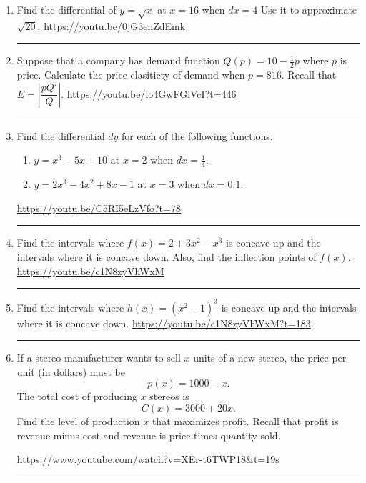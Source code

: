 \documentclass[12pt]{article}
\begin{document}
\begin{enumerate}
\item Find the differential of $y = \sqrt{x}$ at $x = 16$ when $dx = 4$ Use it to approximate $\sqrt{20}$. 
\vfill
\hfill \url{https://youtu.be/0jG3enZdEmk}
\hrule


\item Suppose that a company has demand function $Q(p) = 10 - \frac{1}{2}p$ where $p$ is price.  Calculate the price elasiticty of demand when $p = \$16$. Recall that $E = \left| \dfrac{pQ'}{Q} \right|$. 
\vfill
\hfill \url{https://youtu.be/io4GwFGiVcI?t=446}
\hrule

\item Find the differential $dy$ for each of the following functions. 
\begin{enumerate}
\item $y = x^3 - 5 x + 10$ at $x = 2$ when $dx = \tfrac{1}{4}$. \\ \bigskip
\item $y = 2x^3 - 4x^2 + 8x - 1$ at $ x= 3$ when $dx = 0.1$.
\end{enumerate}
\vfill
\hfill \url{https://youtu.be/C5RI5eLzVfo?t=78}
\hrule



\newpage

\item Find the intervals where $f(x) = 2+3x^2 - x^3$ is concave up and the intervals where it is concave down.  Also, find the inflection points of $f(x)$.  
\vfill
\hfill \url{https://youtu.be/c1N8zyVhWxM}
\hrule

\item Find the intervals where $h(x) = (x^2-1)^3$ is concave up and the intervals where it is concave down.
\vfill
\hfill \url{https://youtu.be/c1N8zyVhWxM?t=183}
\hrule

\item If a stereo manufacturer wants to sell $x$ units of a new stereo, the price per unit (in dollars) must be 
$$p(x) = 1000 - x.$$
The total cost of producing $x$ stereos is 
$$C(x) = 3000 + 20x.$$
Find the level of production $x$ that maximizes profit. Recall that profit is revenue minus cost and revenue is price times quantity sold. 

\vfill
\hfill \url{https://www.youtube.com/watch?v=XEr-t6TWP18&t=19s}
\hrule

\vfill
\end{enumerate}
\end{document}
